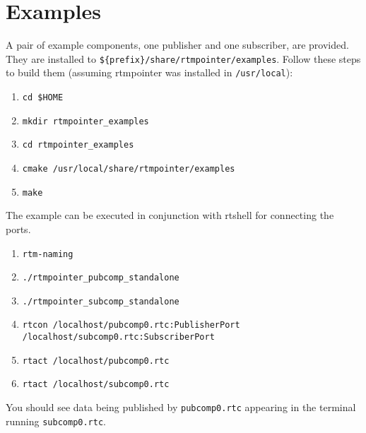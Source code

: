 \documentclass[a4paper,10pt]{article}
\newcommand{\ilcode}[1]{\lstinline|#1|}
\begin{document}
\section{Examples}
\label{sec:examples}

A pair of example components, one publisher and one subscriber, are
provided. They are installed to \ilcode{${prefix}/share/rtmpointer/examples}.
Follow these steps to build them (assuming rtmpointer was installed in
\ilcode{/usr/local}):

\begin{enumerate}
  \item \ilcode{cd $HOME}
  \item \ilcode{mkdir rtmpointer_examples}
  \item \ilcode{cd rtmpointer_examples}
  \item \ilcode{cmake /usr/local/share/rtmpointer/examples}
  \item \ilcode{make}
\end{enumerate}

The example can be executed in conjunction with rtshell for connecting
the ports.

\begin{enumerate}
  \item \ilcode{rtm-naming}
  \item \ilcode{./rtmpointer_pubcomp_standalone}
  \item \ilcode{./rtmpointer_subcomp_standalone}
  \item \ilcode{rtcon /localhost/pubcomp0.rtc:PublisherPort
  /localhost/subcomp0.rtc:SubscriberPort}
  \item \ilcode{rtact /localhost/pubcomp0.rtc}
  \item \ilcode{rtact /localhost/subcomp0.rtc}
\end{enumerate}

You should see data being published by \ilcode{pubcomp0.rtc} appearing in
the terminal running \ilcode{subcomp0.rtc}.

\end{document}
